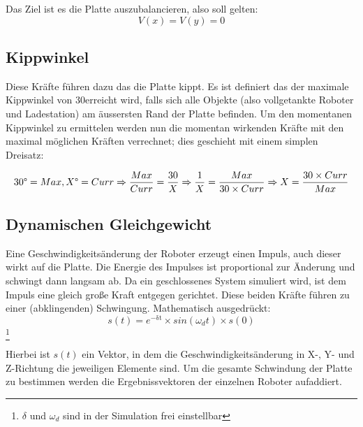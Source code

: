 Das Ziel ist es die Platte auszubalancieren, also soll gelten:
\begin{equation}\label{eq:gleichgewicht}
	V(x) = V(y) = 0
\end{equation}

\subsection{Kippwinkel}
Diese Kr{\"{a}}fte f{\"{u}}hren dazu das die Platte kippt. Es ist definiert das der maximale Kippwinkel von 30\textdegree erreicht wird, falls sich alle
Objekte (also vollgetankte Roboter und Ladestation) am {\"{a}}ussersten Rand der Platte befinden. Um den momentanen Kippwinkel zu ermittelen werden nun
die momentan wirkenden Kr{\"{a}}fte mit den maximal m{\"{o}}glichen Kr{\"{a}}ften verrechnet; dies geschieht mit einem simplen Dreisatz:

\begin{equation}\label{eq:tilt-from-maxtilt}
30\degree = Max, X\degree = Curr \\
\Rightarrow \frac{Max}{Curr} = \frac{30}{X} \\
\Rightarrow \frac{1}{X} = \frac{Max}{30 \times Curr} \\
\Rightarrow X = \frac{30 \times Curr}{Max}
\end{equation}

\subsection{Dynamischen Gleichgewicht}
Eine Geschwindigkeits{\"{a}}nderung der Roboter erzeugt einen Impuls, auch dieser wirkt auf die Platte. Die Energie des Impulses ist proportional zur
{\"{A}}nderung und schwingt dann langsam ab. Da ein geschlossenes System simuliert wird, ist dem Impuls eine gleich gro{\ss}e Kraft entgegen gerichtet.
Diese beiden Kr{\"{a}}fte f{\"{u}}hren zu einer (abklingenden) Schwingung. Mathematisch ausgedr{\"{u}}ckt:
\begin{equation}\label{eq:schwingung}
	s(t) = e^\mathrm{-\delta t} \times sin(\omega_d t) \times s(0)
\end{equation}
\cite{wiki:schwingung}
\footnote{$\delta$ und $\omega_d$ sind in der Simulation frei einstellbar}

Hierbei ist $s(t)$ ein Vektor, in dem die Geschwindigkeits{\"{a}}nderung in X-, Y- und Z-Richtung die jeweiligen Elemente sind. Um die gesamte Schwindung der
Platte zu bestimmen werden die Ergebnissvektoren der einzelnen Roboter aufaddiert.


